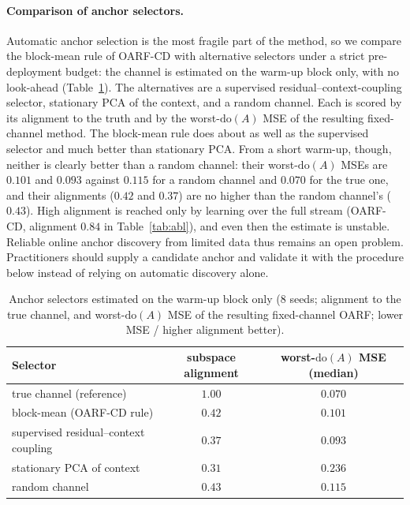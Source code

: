 \documentclass[11pt]{article}
\theoremstyle{plain}
\theoremstyle{remark}
\newcommand{\doop}{\mathrm{do}}
\newcommand{\OARF}{\textsc{OARF}}
\newcommand{\OARFCD}{\textsc{OARF-CD}}
\begin{document}
\paragraph{Comparison of anchor selectors.}
Automatic anchor selection is the most fragile part of the method, so we compare the
block-mean rule of OARF-CD with alternative selectors under a strict pre-deployment
budget: the channel is estimated on the warm-up block only, with no look-ahead
(Table~\ref{tab:sel}). The alternatives are a supervised residual--context-coupling
selector, stationary PCA of the context, and a random channel. Each is scored by its
alignment to the truth and by the worst-$\doop(A)$ MSE of the resulting fixed-channel
method. The block-mean rule does about as well as the supervised selector and much better than stationary PCA. From a short warm-up, though, neither is clearly better than a random channel: their worst-$\doop(A)$ MSEs are $0.101$ and $0.093$ against $0.115$ for a random channel and $0.070$ for the true one, and their alignments ($0.42$ and $0.37$) are no higher than the random channel's ($0.43$). High alignment is reached only by learning over the full stream (\OARFCD{}, alignment $0.84$ in Table~\ref{tab:abl}), and even then the estimate is unstable.
Reliable online anchor discovery from limited data thus remains an open problem.
Practitioners should supply a candidate anchor and validate it with the procedure
below instead of relying on automatic discovery alone.

\begin{table}[htbp]
\centering
\caption{Anchor selectors estimated on the warm-up block only (8 seeds; alignment to
the true channel, and worst-$\doop(A)$ MSE of the resulting fixed-channel \OARF{};
lower MSE / higher alignment better).}
\label{tab:sel}
\small
\begin{tabular}{lcc}
\toprule
Selector & subspace alignment & worst-$\doop(A)$ MSE (median)\\
\midrule
true channel (reference)             & $1.00$ & $0.070$\\
block-mean (OARF-CD rule)            & $0.42$ & $0.101$\\
supervised residual--context coupling & $0.37$ & $0.093$\\
stationary PCA of context            & $0.31$ & $0.236$\\
random channel                       & $0.43$ & $0.115$\\
\bottomrule
\end{tabular}
\end{table}
\end{document}
